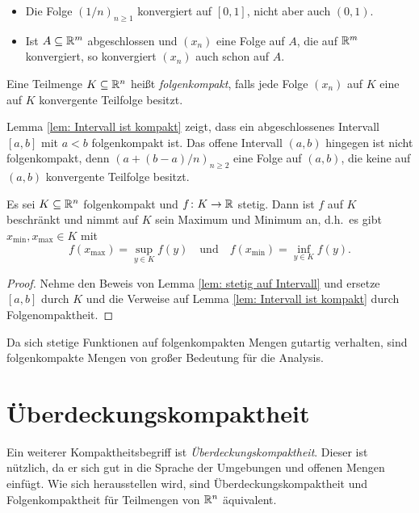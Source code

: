 \documentclass[a4paper,10pt]{article}
\begin{document}
\begin{bsp}
 \begin{itemize}
  \item
   Die Folge $(1/n)_{n \geq 1}$ konvergiert auf $[0,1]$, nicht aber auch $(0,1)$.
  \item
   Ist $A \subseteq \mathbb{R}^m$ abgeschlossen und $(x_n)$ eine Folge auf $A$, die auf $\mathbb{R}^m$ konvergiert, so konvergiert $(x_n)$ auch schon auf $A$.
 \end{itemize}
\end{bsp}


\begin{defi}
 Eine Teilmenge $K \subseteq \mathbb{R}^n$ heißt \emph{folgenkompakt}, falls jede Folge $(x_n)$ auf $K$ eine auf $K$ konvergente Teilfolge besitzt.
\end{defi}


\begin{bsp}
 Lemma \ref{lem: Intervall ist kompakt} zeigt, dass ein abgeschlossenes Intervall $[a,b]$ mit $a < b$ folgenkompakt ist. Das offene Intervall $(a,b)$ hingegen ist nicht folgenkompakt, denn $(a + (b-a)/n)_{n \geq 2}$ eine Folge auf $(a,b)$, die keine auf $(a,b)$ konvergente Teilfolge besitzt.
\end{bsp}


\begin{prop}
 Es sei $K \subseteq \mathbb{R}^n$ folgenkompakt und $f \colon K \to \mathbb{R}$ stetig. Dann ist $f$ auf $K$ beschränkt und nimmt auf $K$ sein Maximum und Minimum an, d.h.\ es gibt $x_{\text{min}}, x_{\text{max}} \in K$ mit
 \[
  f(x_{\text{max}}) = \sup_{y \in K} f(y)
  \quad
  \text{und}
  \quad
  f(x_{\text{min}}) = \inf_{y \in K} f(y).
 \]
\end{prop}
\begin{proof}
 Nehme den Beweis von Lemma \ref{lem: stetig auf Intervall} und ersetze $[a,b]$ durch $K$ und die Verweise auf Lemma \ref{lem: Intervall ist kompakt} durch Folgenompaktheit.
\end{proof}


Da sich stetige Funktionen auf folgenkompakten Mengen gutartig verhalten, sind folgenkompakte Mengen von großer Bedeutung für die Analysis.





\section{Überdeckungskompaktheit}


Ein weiterer Kompaktheitsbegriff ist \emph{Überdeckungskompaktheit}. Dieser ist nützlich, da er sich gut in die Sprache der Umgebungen und offenen Mengen einfügt. Wie sich herausstellen wird, sind Überdeckungskompaktheit und Folgenkompaktheit für Teilmengen von $\mathbb{R}^n$ äquivalent.
\end{document}

